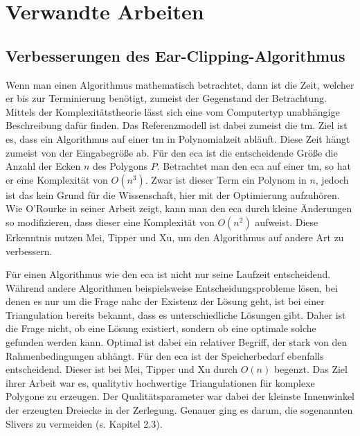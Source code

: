 \section{Verwandte Arbeiten}
\subsection{Verbesserungen des Ear-Clipping-Algorithmus}

Wenn man einen Algorithmus mathematisch betrachtet, dann ist die Zeit, welcher er bis zur Terminierung benötigt, zumeist der
Gegenstand der Betrachtung. Mittels der Komplexitätstheorie lässt sich eine vom Computertyp unabhängige Beschreibung dafür finden. 
Das Referenzmodell ist dabei zumeist die \ac{tm}.\cite{tm} Ziel ist es, dass ein Algorithmus 
auf einer \ac{tm} in Polynomialzeit abläuft. Diese Zeit hängt zumeist von der Eingabegröße ab. Für den \ac{eca} ist die entscheidende 
Größe die Anzahl der Ecken $n$ des Polygons $P$.
Betrachtet man den \ac{eca} auf einer \ac{tm}, so hat er eine Komplexität von $O(n^3)$.
Zwar ist dieser Term ein Polynom in $n$, jedoch ist das kein Grund für die Wissenschaft, hier mit der Optimierung aufzuhören.
Wie O'Rourke in seiner Arbeit zeigt, kann man den \ac{eca} durch kleine Änderungen so modifizieren, dass dieser eine Komplexität von $O(n^2)$
aufweist.\cite{orourke} Diese Erkenntnis nutzen Mei, Tipper und Xu, um den Algorithmus auf andere Art zu verbessern.\cite{earclipping}

Für einen Algorithmus wie den \ac{eca} ist nicht nur seine Laufzeit entscheidend. Während andere Algorithmen beispielsweise Entscheidungsprobleme lösen, 
bei denen es nur um die Frage nahc der Existenz der Lösung geht, ist bei einer Triangulation bereits bekannt, dass es unterschiedliche Lösungen gibt.
Daher ist die Frage nicht, ob eine Lösung existiert, sondern ob eine optimale solche gefunden werden kann. Optimal ist dabei ein relativer Begriff, 
der stark von den Rahmenbedingungen abhängt. Für den \ac{eca} ist der Speicherbedarf ebenfalls entscheidend. Dieser ist bei Mei, Tipper und Xu durch $O(n)$
begenzt. Das Ziel ihrer Arbeit war es, qualitytiv hochwertige Triangulationen für komplexe Polygone zu erzeugen. Der Qualitätsparameter war dabei der kleinste 
Innenwinkel der erzeugten Dreiecke in der Zerlegung. Genauer ging es darum, die sogenannten Slivers zu vermeiden (s. Kapitel 2.3).

